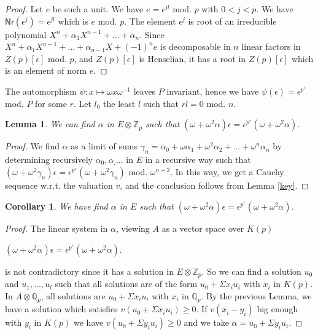 \documentclass[10pt,a4paper]{article}
\newtheorem{corollary}{Corollary}[section]
\newtheorem{lemma}{Lemma}[section]
\newcommand{\ints}{\mathbb{Z}}
\newcommand{\rats}{\mathbb{Q}}
\newcommand\Nm{\mathsf{Nr}}
\begin{document}
 \begin{proof}
   Let $e$ be such a unit. We have $e = \epsilon^{jl}$ mod. $p$ with $0<j<p$.
   We have $\Nm(\epsilon^j) = \epsilon^{jl}$ which is $e$ mod. $p$. The element $\epsilon^j$
   is root of an irreducible polynomial $X^n + \alpha_1 X^{n-1}+\dots+\alpha_n$. Since
   $X^n+\alpha_1 X^{n-1} +\dots +\alpha_{n-1}X + (-1)^ne$ is decomposable in $n$ linear factors in $Z(p)[\epsilon]$
   mod. $p$, and $Z(p)[\epsilon]$ is Henselian, it has a root in $Z(p)[\epsilon]$ which is an element of norm $e$.
 \end{proof}
 
 The automorphism $\psi : x\mapsto \omega x \omega^{-1}$ leaves $P$ invariant, hence we have
 $\psi(\epsilon) = \epsilon^{p^r}$ mod. $P$ for some $r$. Let $l_0$ the least $l$ such that $rl = 0$ mod. $n$.

 \begin{lemma}
   We can find $\alpha$ in $E\otimes \ints_p$ such that
   $(\omega+\omega^2 \alpha) \epsilon = \epsilon^{p^r}(\omega + \omega^2\alpha)$.
 \end{lemma}

 \begin{proof}
   We find $\alpha$ as a limit of sums $\gamma_n = \alpha_0 +\omega \alpha_1 + \omega^2\alpha_2+\dots + \omega^n\alpha_n$ by determining
   recursively $\alpha_0,\alpha_,\dots$ in $E$ in a recursive way such that
   $(\omega + \omega^2\gamma_n)\epsilon = \epsilon^{p^r} (\omega + \omega^2\gamma_n)$ mod. $\omega^{n+2}$.
   In this way, we get a Cauchy sequence w.r.t. the valuation $v$, and the conclusion follows
   from Lemma \ref{key}.
 \end{proof}
 
 \begin{corollary}
   We have find $\alpha$ in $E$ such that
   $(\omega+\omega^2 \alpha) \epsilon = \epsilon^{p^r}(\omega + \omega^2\alpha)$.
 \end{corollary}

 \begin{proof}
   The linear system in $\alpha$, viewing $A$ as a vector space over $K(p)$
   \begin{center}
     $(\omega+\omega^2 \alpha) \epsilon = \epsilon^{p^r}(\omega + \omega^2\alpha)$.
   \end{center}
   is not contradictory since it has a solution in $E\otimes \ints_p$. So we can find a solution
   $u_0$ and $u_1,\dots,u_l$ such that all solutions are of the form $u_0+\Sigma x_i u_i$ with
   $x_i$ in $K(p)$. In $A\otimes \rats_p$, all solutions are $u_0+\Sigma x_i u_i$ with $x_i$ in $\rats_p$.
   By the previous Lemma, we have a solution which satisfies $v(u_0+\Sigma x_i u_i)\geqslant 0$.
   If $v(x_i-y_i)$ big enough with $y_i$  in $K(p)$ we have $v(u_0+\Sigma y_iu_i)\geqslant 0$ and
   we take $\alpha = u_0+\Sigma y_iu_i$. 
 \end{proof}
 
\end{document}
